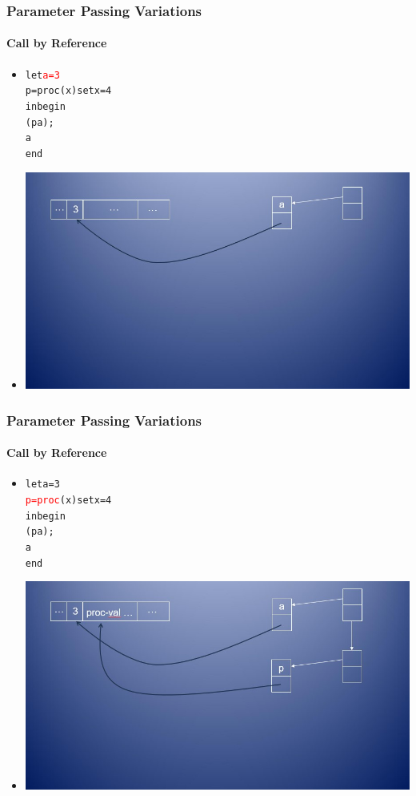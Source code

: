 \documentclass{beamer}
\begin{document}
\begin{frame}[fragile]
\frametitle{Parameter Passing Variations}
\framesubtitle{Call by Reference}
\begin{scriptsize}
\begin{itemize}
\item<1-> 
\begin{alltt}
let \textcolor{red}{a = 3}
	p = proc (x) set x = 4
in begin 
    (p a); 
    a
   end
\end{alltt}

\item<1->
\begin{center}
  \includegraphics[scale=0.5]{cbr1.jpg}
\end{center}

\end{itemize}
\end{scriptsize}
\end{frame}

\begin{frame}[fragile]
\frametitle{Parameter Passing Variations}
\framesubtitle{Call by Reference}
\begin{scriptsize}
\begin{itemize}
\item<1->
\begin{alltt}
let a = 3
	\textcolor{red}{p = proc} (x) set x = 4
in begin
    (p a);
    a
   end
\end{alltt}

\item<1->
\begin{center}
  \includegraphics[scale=0.5]{cbr2.jpg}
\end{center}

\end{itemize}
\end{scriptsize}
\end{frame}
\end{document}
